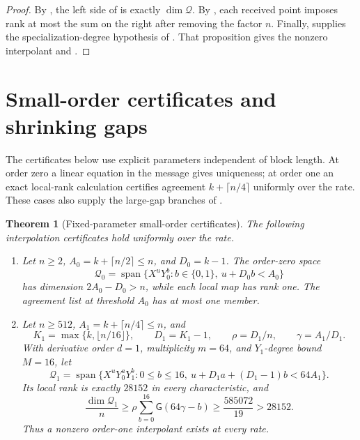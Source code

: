\documentclass[11pt,letterpaper]{article}
\newtheorem{theorem}{Theorem}[section]
\theoremstyle{definition}
\newcommand{\Qspace}{\mathcal{Q}}
\begin{document}
\begin{proof}
By , the left side of
 is exactly \(\dim\Qspace\).
By , each received point imposes rank at most the
sum on the right after removing the factor \(n\).  Finally,
 supplies the specialization-degree
hypothesis of .  That proposition
gives the nonzero interpolant and .
\end{proof}
 \section{Small-order certificates and shrinking gaps}
\label{sec:optimized-parameters}

The certificates below use explicit parameters independent of block length.
At order zero a linear equation in the message gives uniqueness; at order
one an exact local-rank calculation certifies agreement $k+\lceil n/4\rceil$
uniformly over the rate. These cases also supply the large-gap branches of
.

\begin{theorem}[Fixed-parameter small-order certificates]
\label{thm:small-derivative-orders}
The following interpolation certificates hold uniformly over the rate.
\begin{enumerate}
  \item Let $n\geq2$, $A_0=k+\lceil n/2\rceil\leq n$, and $D_0=k-1$.  The order-zero space
  \begin{equation}
    \mathcal Q_0=
    \operatorname{span}\{X^uY_0^b:b\in\{0,1\},\ u+D_0b<A_0\}
    \label{eq:order-zero-space}
  \end{equation}
  has dimension $2A_0-D_0>n$, while each local map has rank one.  The agreement list at threshold
  $A_0$ has at most one member.

  \item Let $n\geq512$, $A_1=k+\lceil n/4\rceil\leq n$, and
  \[
    K_1=\max\{k,\lfloor n/16\rfloor\},
    \qquad
    D_1=K_1-1,
    \qquad
    \rho=D_1/n,
    \qquad
    \gamma=A_1/D_1.
  \]
  With derivative order $d=1$, multiplicity $m=64$, and $Y_1$-degree bound $M=16$, let
  \begin{equation}
    \mathcal Q_1=
    \operatorname{span}\{X^uY_0^aY_1^b:
      0\leq b\leq16,\ u+D_1a+(D_1-1)b<64A_1\}.
    \label{eq:order-one-space}
  \end{equation}
  Its local rank is exactly $28152$ in every characteristic, and
  \begin{equation}
    \frac{\dim\mathcal Q_1}{n}
    \geq\rho\sum_{b=0}^{16}\mathsf G(64\gamma-b)
    \geq\frac{585072}{19}>28152.
    \label{eq:order-one-dimension}
  \end{equation}
  Thus a nonzero order-one interpolant exists at every rate.
\end{enumerate}
\end{theorem}
\end{document}

